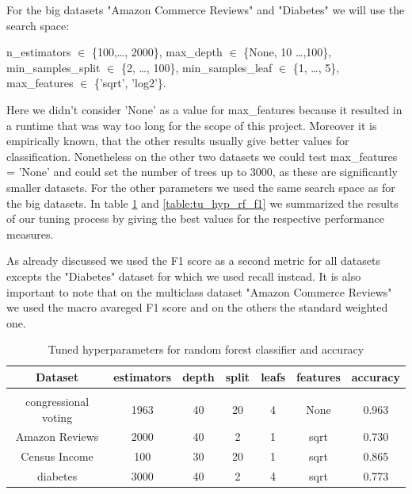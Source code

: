 \documentclass[a4paper,10pt]{article}
\begin{document}
For the big datasets "Amazon Commerce Reviews" and "Diabetes" we will use the search space:
 

\begin{center}
    \parbox{0.75\textwidth}{%
    \raggedright
    \textsf{n\_estimators} \(\in\) \{100,\dots, 2000\}, \textsf{max\_depth} \(\in\) \{None, 10 \dots ,100\}, \\
    \textsf{min\_samples\_split} \(\in\) \{2, \dots, 100\}, \textsf{min\_samples\_leaf} \(\in\) \{1, \dots, 5\}, \\
    \textsf{max\_features} \(\in\) \{'sqrt', 'log2'\}.}
\end{center}

Here we didn't consider 'None' as a value for \textsf{max\_features} because it resulted in a runtime that was way too long for the scope of this project. Moreover it is empirically known, that the other results usually give better values for classification. Nonetheless on the other two datasets we could test \textsf{max\_features} = 'None' and could set the number of trees up to 3000, as these are significantly smaller datasets. For the other parameters we used the same search space as for the big datasets. In table \ref{table:tu_hyp_rf_ac} and \ref{table:tu_hyp_rf_f1} we summarized the results of our tuning process by giving the best values for the respective performance measures.

As already discussed we used the F1 score as a second metric for all datasets excepts the "Diabetes" dataset for which we used recall instead. It is also important to note that on the multiclass dataset "Amazon Commerce Reviews" we used the macro avareged F1 score and on the others the standard weighted one.

\begin{table}[h!]
    \centering
    \begin{tabular}{|c|c|c|c|c|c|c|}
    \hline
    Dataset & \textsf{estimators} & \textsf{depth} & \textsf{split} & \textsf{leafs} & \textsf{features} & accuracy \\
    \hline
    \multicolumn{7}{c}{\vspace{-0.4cm}} \\ %
    \hline
    congressional voting & 1963 & 40 & 20 & 4 & None & 0.963 \\%
    \hline
    Amazon Reviews & 2000 & 40 & 2 & 1 & sqrt & 0.730 \\%
    \hline
    Census Income & 100 & 30 & 20 & 1 & sqrt & 0.865 \\%
    \hline
    diabetes & 3000 & 40 & 2 & 4 & sqrt & 0.773 \\%
    \hline
    \end{tabular}
    \caption{Tuned hyperparameters for random forest classifier and accuracy} 
    \label{table:tu_hyp_rf_ac}
    \end{table}
\end{document}
